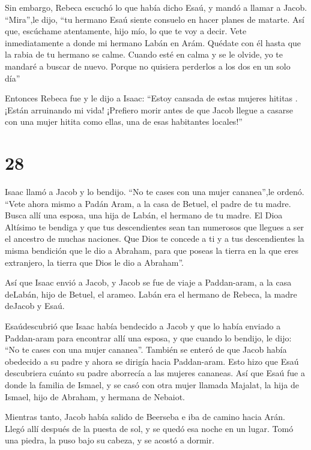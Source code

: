  Sin embargo, Rebeca escuchó lo que había dicho Esaú, y
mandó a llamar a Jacob. ``Mira'',le dijo, ``tu hermano Esaú siente
consuelo en hacer planes de matarte.  Así que, escúchame
atentamente, hijo mío, lo que te voy a decir. Vete inmediatamente a
donde mi hermano Labán en Arám.  Quédate con él hasta que
la rabia de tu hermano se calme.  Cuando esté en calma y se
le olvide, yo te mandaré a buscar de nuevo. Porque no quisiera perderlos
a los dos en un solo día''

 Entonces Rebeca fue y le dijo a Isaac: ``Estoy cansada de
estas mujeres hititas . ¡Están arruinando mi vida! ¡Prefiero morir antes
de que Jacob llegue a casarse con una mujer hitita como ellas, una de
esas habitantes locales!''

\hypertarget{section-27}{%
\section{28}\label{section-27}}

 Isaac llamó a Jacob y lo bendijo. ``No te cases con una
mujer cananea'',le ordenó.  ``Vete ahora mismo a Padán Aram,
a la casa de Betuel, el padre de tu madre. Busca allí una esposa, una
hija de Labán, el hermano de tu madre.  El Dioa Altísimo te
bendiga y que tus descendientes sean tan numerosos que llegues a ser el
ancestro de muchas naciones.  Que Dios te concede a ti y a
tus descendientes la misma bendición que le dio a Abraham, para que
poseas la tierra en la que eres extranjero, la tierra que Dios le dio a
Abraham''.

 Así que Isaac envió a Jacob, y Jacob se fue de viaje a
Paddan-aram, a la casa deLabán, hijo de Betuel, el arameo. Labán era el
hermano de Rebeca, la madre deJacob y Esaú.

 Esaúdescubrió que Isaac había bendecido a Jacob y que lo
había enviado a Paddan-aram para encontrar allí una esposa, y que cuando
lo bendijo, le dijo: ``No te cases con una mujer cananea''. 
También se enteró de que Jacob había obedecido a su padre y ahora se
dirigía hacia Paddan-aram.  Esto hizo que Esaú descubriera
cuánto su padre aborrecía a las mujeres cananeas.  Así que
Esaú fue a donde la familia de Ismael, y se casó con otra mujer llamada
Majalat, la hija de Ismael, hijo de Abraham, y hermana de Nebaiot.

 Mientras tanto, Jacob había salido de Beerseba e iba de
camino hacia Arán.  Llegó allí después de la puesta de sol,
y se quedó esa noche en un lugar. Tomó una piedra, la puso bajo su
cabeza, y se acostó a dormir.

